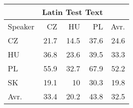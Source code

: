\begin{tabular}{l|rrr|r}
\hline
 & \multicolumn{3}{c}{Latin Test Text} & \\
\hline
 Speaker   &   CZ &   HU &   PL &   Avr. \\
\hline
 CZ        & 21.7 & 14.5 & 37.6 &   24.6 \\
 HU        & 36.8 & 23.6 & 39.5 &   33.3 \\
 PL        & 55.9 & 32.7 & 67.9 &   52.2 \\
 SK        & 19.1 & 10   & 30.3 &   19.8 \\
\hline
 Avr.     & 33.4 & 20.2 & 43.8 &   32.5 \\
\hline
\end{tabular}